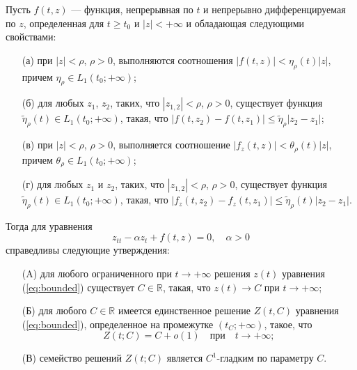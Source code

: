 \begin{lemma}
Пусть $f(t, z)$ --- функция, непрерывная по $t$ и непрерывно дифференцируемая по $z$, определенная для $t \ge t_0$ и $|z| < +\infty$ и обладающая следующими свойствами:
%
\begin{itemize}
\item[(а)] при $|z| < \rho$, $\rho > 0$, выполняются соотношения $|f(t,z)| < \eta_{\rho}(t)|z|$, причем $\eta_{\rho} \in L_1(t_0; +\infty)$;
\item[(б)] для любых $z_1$, $z_2$, таких, что $|z_{1,2}| < \rho$, $\rho > 0$, существует функция $\tilde{\eta}_{\rho}(t) \in L_1(t_0; +\infty)$, такая, что $|f(t, z_2) - f(t, z_1)| \le \tilde{\eta}_{\rho} |z_2 - z_1|$;
\item[(в)] при $|z| < \rho$, $\rho > 0$, выполняется соотношение $|f_z(t,z)| < \theta_{\rho}(t)|z|$, причем $\theta_{\rho} \in L_1(t_0; +\infty)$;
\item[(г)] для любых $z_1$ и $z_2$, таких, что $|z_{1,2}| < \rho$, $\rho > 0$, существует функция $\tilde{\eta}_{\rho}(t) \in L_1(t_0; +\infty)$, такая, что $|f_z(t, z_2) - f_z(t, z_1)| \le \tilde{\eta}_{\rho}(t) |z_2 - z_1|$.
\end{itemize}
%
Тогда для уравнения
%
\begin{equation}
z_{tt} - \alpha z_t + f(t,z) = 0, \quad \alpha > 0
\label{eq:bounded}
\end{equation}
%
справедливы следующие утверждения:
%
\begin{itemize}
\item[(A)] для любого ограниченного при $t \to +\infty$ решения $z(t)$ уравнения (\ref{eq:bounded}) существует $C \in \mathbb{R}$, такая, что $z(t) \to C$ при $t \to +\infty$;
\item[(Б)] для любого $C \in \mathbb{R}$ имеется единственное решение $Z(t, C)$ уравнения (\ref{eq:bounded}), определенное на промежутке $(t_C; +\infty)$, такое, что
%
\begin{equation}
Z(t;C)=C+o(1)\quad \mbox{при} \quad t \to +\infty;
\label{eq:bounded_asympt}
\end{equation}
%
\item[(В)] семейство решений $Z(t; C)$ является $C^1$-гладким по параметру $C$.
\end{itemize}
%
\label{lemma:bounded}
\end{lemma}
%
